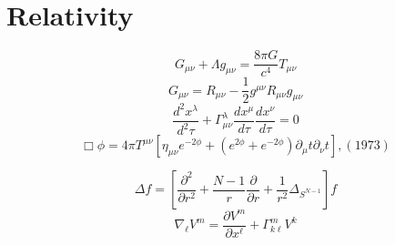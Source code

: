 \documentclass{beamer}
\begin{document}
\section{Relativity}
\begin{frame}
$$G_{\mu \nu}+\Lambda g_{\mu \nu}=\frac{8 \pi G}{c^4}T_{\mu\nu}$$
$$G_{\mu \nu}=R_{\mu \nu}-\frac{1}{2}g^{\mu \nu}R_{\mu \nu}g_{\mu\nu}$$
$$\frac{d^2 x^{\lambda}}{d^2  \tau}+\Gamma^{\lambda}_{\mu \nu}\frac{d x^{\mu}}{d \tau}\frac{d x^{\nu}}{d  \tau}=0$$
$$\Box \phi=4 \pi T^{\mu \nu}[\eta_{\mu \nu}e^{-2\phi}+(e^{2\phi}+e^{-2\phi})\partial_{\mu}t\partial_{\nu}t],(1973)$$
\end{frame}
\begin{frame}
$$
\Delta f=[\frac{\partial^2}{\partial r^2}+\frac{N-1}{r}\frac{\partial}{\partial r}+\frac{1}{r^2}\Delta_{S^{N-1}}]f
$$
$$
\nabla_\ell V^m=\frac{\partial V^m}{\partial x^\ell}+\Gamma^m_{k \ell}V^k
$$
\end{frame}
\end{document}
